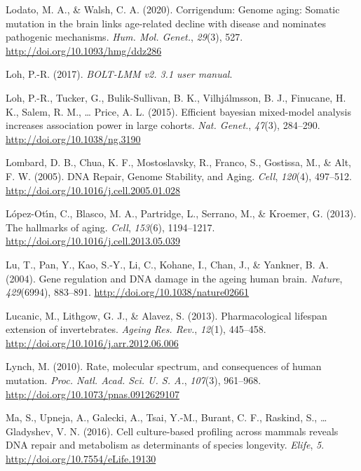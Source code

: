 \documentclass[12pt,twoside]{unicam}
\begin{document}
\begin{cslreferences}
\leavevmode\hypertarget{ref-Lodato2020}{}%
Lodato, M. A., \& Walsh, C. A. (2020). Corrigendum: Genome aging: Somatic mutation in the brain links age-related decline with disease and nominates pathogenic mechanisms. \emph{Hum. Mol. Genet.}, \emph{29}(3), 527. \url{http://doi.org/10.1093/hmg/ddz286}

\leavevmode\hypertarget{ref-Loh2017}{}%
Loh, P.-R. (2017). \emph{BOLT-LMM v2. 3.1 user manual}.

\leavevmode\hypertarget{ref-Loh2015}{}%
Loh, P.-R., Tucker, G., Bulik-Sullivan, B. K., Vilhjálmsson, B. J., Finucane, H. K., Salem, R. M., \ldots{} Price, A. L. (2015). Efficient bayesian mixed-model analysis increases association power in large cohorts. \emph{Nat. Genet.}, \emph{47}(3), 284--290. \url{http://doi.org/10.1038/ng.3190}

\leavevmode\hypertarget{ref-Lombard2005}{}%
Lombard, D. B., Chua, K. F., Mostoslavsky, R., Franco, S., Gostissa, M., \& Alt, F. W. (2005). DNA Repair, Genome Stability, and Aging. \emph{Cell}, \emph{120}(4), 497--512. \url{http://doi.org/10.1016/j.cell.2005.01.028}

\leavevmode\hypertarget{ref-Lopez-Otin2013}{}%
López-Otı́n, C., Blasco, M. A., Partridge, L., Serrano, M., \& Kroemer, G. (2013). The hallmarks of aging. \emph{Cell}, \emph{153}(6), 1194--1217. \url{http://doi.org/10.1016/j.cell.2013.05.039}

\leavevmode\hypertarget{ref-Lu2004}{}%
Lu, T., Pan, Y., Kao, S.-Y., Li, C., Kohane, I., Chan, J., \& Yankner, B. A. (2004). Gene regulation and DNA damage in the ageing human brain. \emph{Nature}, \emph{429}(6994), 883--891. \url{http://doi.org/10.1038/nature02661}

\leavevmode\hypertarget{ref-Lucanic2013}{}%
Lucanic, M., Lithgow, G. J., \& Alavez, S. (2013). Pharmacological lifespan extension of invertebrates. \emph{Ageing Res. Rev.}, \emph{12}(1), 445--458. \url{http://doi.org/10.1016/j.arr.2012.06.006}

\leavevmode\hypertarget{ref-Lynch2010}{}%
Lynch, M. (2010). Rate, molecular spectrum, and consequences of human mutation. \emph{Proc. Natl. Acad. Sci. U. S. A.}, \emph{107}(3), 961--968. \url{http://doi.org/10.1073/pnas.0912629107}

\leavevmode\hypertarget{ref-Ma2016}{}%
Ma, S., Upneja, A., Galecki, A., Tsai, Y.-M., Burant, C. F., Raskind, S., \ldots{} Gladyshev, V. N. (2016). Cell culture-based profiling across mammals reveals DNA repair and metabolism as determinants of species longevity. \emph{Elife}, \emph{5}. \url{http://doi.org/10.7554/eLife.19130}


\end{cslreferences}
\end{document}
